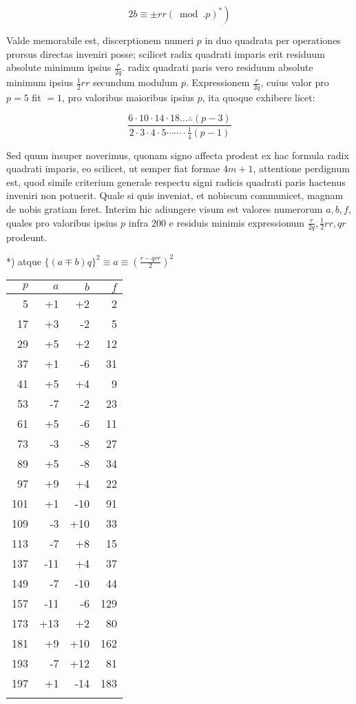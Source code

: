 \documentclass[10pt]{article}
\begin{document}
\[
\left.2 b \equiv \pm r r(\bmod . p)^{*}\right)
\]

Valde memorabile est, discerptionem numeri \(p\) in duo quadrata per operationes prorsus directas inveniri posse; scilicet radix quadrati imparis erit residuum absolute minimum ipsius \(\frac{r}{2 q}\). radix quadrati paris vero residuum absolute minimum ipsius \(\frac{1}{2} r r\) secundum modulum \(p\). Expressionem \(\frac{r}{2 q}\), cuius valor pro \(p=5\) fit \(=1\), pro valoribus maioribus ipsius \(p\), ita quoque exhibere licet:

\[
\frac{6 \cdot 10 \cdot 14 \cdot 18 \ldots \therefore(p-3)}{2 \cdot 3 \cdot 4 \cdot 5 \cdots \cdots \cdot \frac{1}{4}(p-1)}
\]

Sed quum insuper noverimus, quonam signo affecta prodeat ex hac formula radix quadrati imparis, eo scilicet, ut semper fiat formae \(4 m+1\), attentione perdignum est, quod simile criterium generale respectu signi radicis quadrati paris hactenus inveniri non potuerit. Quale si quis inveniat, et nobiscum communicet, magnam de nobis gratiam feret. Interim hic adiungere visum est valores numerorum \(a, b, f\), quales pro valoribus ipsius \(p\) infra 200 e residuis minimis expressionum \(\frac{r}{2 q}, \frac{1}{2} r r, q r\) prodeunt.

*) atque \(\{(a \mp b) q\}^{2} \equiv a \equiv\left(\frac{r-q r r}{2}\right)^{2}\)

\begin{center}
\begin{tabular}{r|r|r|r}
\(p\) & \(a\) & \(b\) & \(f\) \\
\hline
5 & +1 & +2 & 2 \\
17 & +3 & -2 & 5 \\
29 & +5 & +2 & 12 \\
37 & +1 & -6 & 31 \\
41 & +5 & +4 & 9 \\
53 & -7 & -2 & 23 \\
61 & +5 & -6 & 11 \\
73 & -3 & -8 & 27 \\
89 & +5 & -8 & 34 \\
97 & +9 & +4 & 22 \\
101 & +1 & -10 & 91 \\
109 & -3 & +10 & 33 \\
113 & -7 & +8 & 15 \\
137 & -11 & +4 & 37 \\
149 & -7 & -10 & 44 \\
157 & -11 & -6 & 129 \\
173 & +13 & +2 & 80 \\
181 & +9 & +10 & 162 \\
193 & -7 & +12 & 81 \\
197 & +1 & -14 & 183 \\
 &  &  &  \\
\end{tabular}
\end{center}
\end{document}
